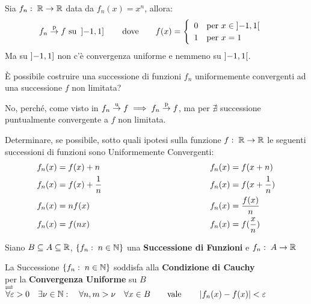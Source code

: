 \begin{example}
	\label{ex:conv_punt_nimplies_conv_unif}
	Sia $f_n:\; \mathbb{R} \to \mathbb{R}$ data da $f_n(x) = x^n$, allora:
	\[
		f_n \overset{\text{p}}{\to} f \text{ su } \left]-1,1\right]
		\qquad \text{dove} \qquad
		f(x) = \begin{cases}
			\begin{array}{ll}
				0 & \text{per } x \in \left]-1,1\right[\\
				1 & \text{per } x = 1
			\end{array}
		\end{cases}
	\]
	Ma su $\left]-1,1\right]$ non c'è convergenza uniforme e nemmeno su $\left]-1,1\right[$.
\end{example}
\begin{exercise}
	È possibile costruire una successione di funzioni $f_n$ uniformemente convergenti ad una successione $f$ non limitata?
	\begin{solution}
		No, perché, come visto in  $f_n \overset{\text{u}}{\to} f \implies f_n \overset{\text{p}}{\to} f$, ma per  $\nexists$ successione puntualmente convergente a $f$ non limitata.
	\end{solution}
\end{exercise}
\begin{exercise}
	Determinare, se possibile, sotto quali ipotesi sulla funzione $f:\; \mathbb{R} \to \mathbb{R}$ le seguenti successioni di funzioni sono Uniformemente Convergenti:
	\begin{alignat*}{2}
		f_n(x) &= f(x) + n \hspace*{.35\linewidth} & f_n(x) &= f(x + n)\\
		f_n(x) &= f(x) + \frac{1}{n} & f_n(x) &= f(x + \frac{1}{n})\\
		f_n(x) &= nf(x) & f_n(x) &= \frac{f(x)}{n}\\
		f_n(x) &= f(nx) & f_n(x) &= f(\frac{x}{n})
	\end{alignat*}
\end{exercise}
\begin{definition}
	\label{def:succ_funz_cau}
	Siano $B \subseteq A \subseteq \mathbb{R}$, $\left\{f_n:\; n \in \mathbb{N}\right\}$ una \textbf{Successione di Funzioni} e $f_n:\; A \to \mathbb{R}$
	\begin{center}
		La Successione $\left\{f_n:\; n \in \mathbb{N}\right\}$ soddisfa alla \textbf{Condizione di Cauchy}\\
		per la \textbf{Convergenza Uniforme} su $B$\\
		$\rightleftharpoons$\\
		$
			\forall \varepsilon > 0 \quad \exists \nu \in \N: \quad \forall n, m > \nu \quad \forall x \in B %
			\qquad \text{vale} \qquad \abs{f_n(x) - f(x)} < \varepsilon
		$
	\end{center}
\end{definition}
